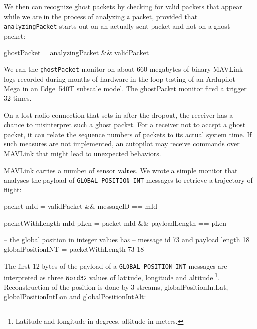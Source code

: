 We then can recognize ghost packets by checking for valid packets that appear
while we are in the process of analyzing a packet, provided that {\tt
  analyzingPacket} starts out on an actually sent packet and not on a ghost
packet:

\begin{code}
ghostPacket = analyzingPacket && validPacket
\end{code}


We ran the {\tt ghostPacket} monitor on about 660 megabytes of
binary MAVLink logs recorded during months of hardware-in-the-loop
testing of an Ardupilot Mega in an Edge~540T subscale model. %
The ghostPacket monitor fired a trigger 32 times.  

On a lost radio connection that sets in after the dropout, the receiver has a
chance to misinterpret such a ghost packet.  For a receiver not to accept a
ghost packet, it can relate the sequence numbers of packets to its actual system
time. If such measures are not implemented, an autopilot may receive commands
over MAVLink that might lead to unexpected behaviors.

MAVLink carries a number of sensor values. We wrote a simple monitor that
analyses the payload of {\tt GLOBAL\_POSITION\_INT} messages to retrieve a
trajectory of flight:

\begin{code}
packet mId = validPacket && messageID == mId

packetWithLength mId pLen = packet mId
                          && payloadLength == pLen

-- the global position in integer values has 
-- message id 73  and payload length 18
globalPositionINT = packetWithLength 73 18
\end{code}

The first 12 bytes of the payload of a {\small \tt GLOBAL\_POSITION\_INT}
messages are interpreted as three {\tt Word32} values of latitude, longitude and
altitude
\footnote{Latitude and longitude in degrees, altitude in meters.}.
Reconstruction of the position is done by 3 streams, globalPositionIntLat,
globalPositionIntLon and globalPositionIntAlt:

